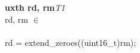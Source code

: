 


\begin{instructionblock}{\imagewidth}%
    \textbf{uxth rd, rm}\hfill\textit{T1}\\
    rd, rm $\in$ \baseregisters\\
    {}\\
    rd = extend\_zeroes((uint16\_t)rm);
\end{instructionblock}

